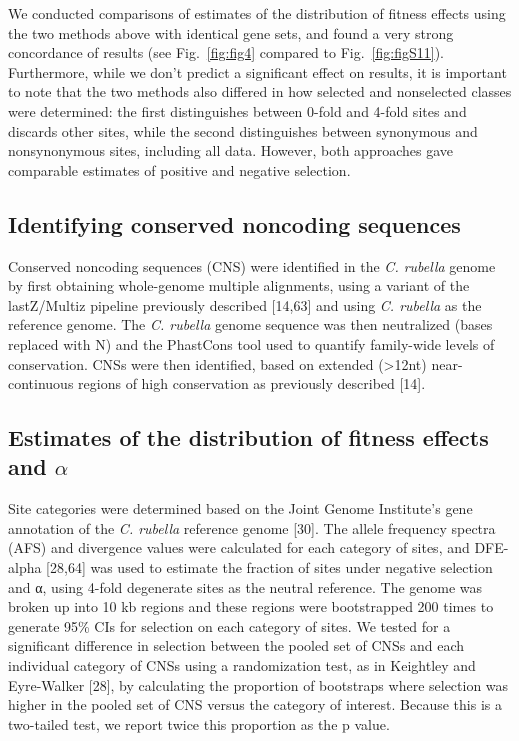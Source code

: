 We conducted comparisons of estimates of the distribution of fitness effects using the two methods above with identical gene sets, and found a very strong concordance of results (see Fig.~\ref{fig:fig4} compared to Fig.~\ref{fig:figS11}). Furthermore, while we don't predict a significant effect on results, it is important to note that the two methods also differed in how selected and nonselected classes were determined: the first distinguishes between 0-fold and 4-fold sites and discards other sites, while the second distinguishes between synonymous and nonsynonymous sites, including all data. However, both approaches gave comparable estimates of positive and negative selection.

\subsection{Identifying conserved noncoding sequences}
Conserved noncoding sequences (CNS) were identified in the \textit{C. rubella} genome by first obtaining whole-genome multiple alignments, using a variant of the lastZ/Multiz pipeline previously described [14,63] and using \textit{C. rubella} as the reference genome. The \textit{C. rubella} genome sequence was then neutralized (bases replaced with N) and the PhastCons tool used to quantify family-wide levels of conservation. CNSs were then identified, based on extended (>12nt) near-continuous regions of high conservation as previously described [14].   

\subsection{Estimates of the distribution of fitness effects and $\alpha$}
Site categories were determined based on the Joint Genome Institute’s gene annotation of the \textit{C. rubella} reference genome [30]. The allele frequency spectra (AFS) and divergence values were calculated for each category of sites, and DFE-alpha [28,64] was used to estimate the fraction of sites under negative selection and α, using 4-fold degenerate sites as the neutral reference. The genome was broken up into 10 kb regions and these regions were bootstrapped 200 times to generate 95\% CIs for selection on each category of sites. We tested for a significant difference in selection between the pooled set of CNSs and each individual category of CNSs using a randomization test, as in Keightley and Eyre-Walker [28], by calculating the proportion of bootstraps where selection was higher in the pooled set of CNS versus the category of interest. Because this is a two-tailed test, we report twice this proportion as the p value. 

